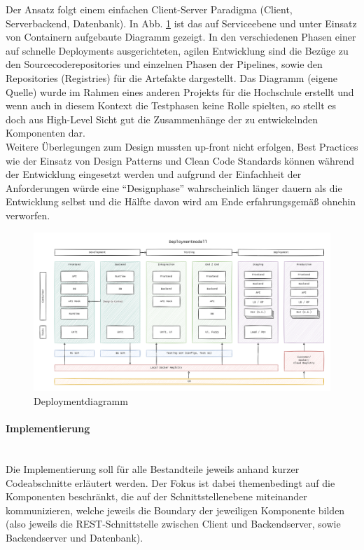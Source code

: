\documentclass[notitlepage, hidelinks]{article}
\begin{document}
Der Ansatz folgt einem einfachen Client-Server Paradigma (Client, Serverbackend, Datenbank). In Abb. \ref{deploymentdiagramm} ist das auf Serviceebene und unter Einsatz von Containern aufgebaute Diagramm gezeigt. In den verschiedenen Phasen einer auf schnelle Deployments ausgerichteten, agilen Entwicklung sind die Bezüge zu den Sourcecoderepositories und einzelnen Phasen der Pipelines, sowie den Repositories (Registries) für die Artefakte dargestellt. Das Diagramm (eigene Quelle) wurde im Rahmen eines anderen Projekts für die Hochschule erstellt und wenn auch in diesem Kontext die Testphasen keine Rolle spielten, so stellt es doch aus High-Level Sicht gut die Zusammenhänge der zu entwickelnden Komponenten dar. \\
Weitere Überlegungen zum Design mussten up-front nicht erfolgen, Best Practices wie der Einsatz von Design Patterns und Clean Code Standards können während der Entwicklung eingesetzt werden und aufgrund der Einfachheit der Anforderungen würde eine ``Designphase'' wahrscheinlich länger dauern als die Entwicklung selbst und die Hälfte davon wird am Ende erfahrungsgemäß ohnehin verworfen. 

\begin{figure}[H]
\centering
  \includegraphics[width=\textwidth]{images/deployment.png}
  \caption{Deploymentdiagramm}
  \label{deploymentdiagramm}
\end{figure}



\paragraph{Implementierung} \mbox{} \\
Die Implementierung soll für alle Bestandteile jeweils anhand kurzer Codeabschnitte erläutert werden. Der Fokus ist dabei themenbedingt auf die Komponenten beschränkt, die auf der Schnittstellenebene miteinander kommunizieren, welche jeweils die Boundary der jeweiligen Komponente bilden (also jeweils die REST-Schnittstelle zwischen Client und Backendserver, sowie Backendserver und Datenbank).
\end{document}
